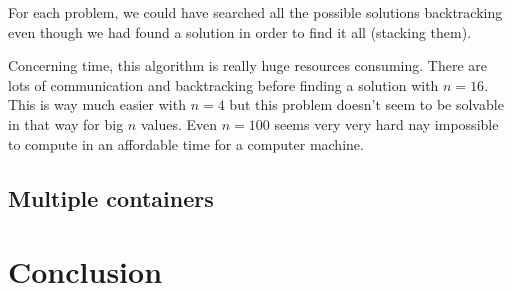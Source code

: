 \documentclass[a4paper,11pt]{article}
\begin{document}
For each problem, we could have searched all the possible solutions backtracking even 
though we had found a solution in order to find it all (stacking them).
  
Concerning time, this algorithm is really huge resources consuming. There are lots of 
communication and backtracking before finding a solution with $n = 16$. This is way much 
easier with $n = 4$ but this problem doesn't seem to be solvable in that way for big $n$ 
values. Even $n = 100$ seems very very hard nay impossible to compute in an affordable 
time for a computer machine.
  

  \subsection{Multiple containers}


  \section{Conclusion}
  
\end{document}
